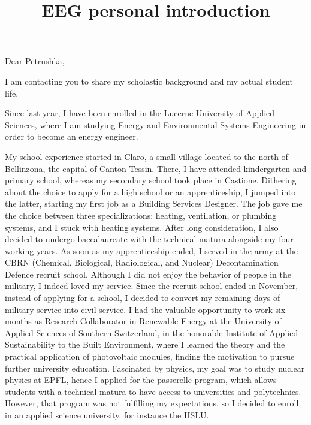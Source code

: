 \documentclass{article}
\title{\textbf{EEG personal introduction}}
\date{}
\begin{document}
\maketitle
\vspace*{-1.5cm}

Dear Petrushka,
\setlength{\parskip}{1.5em}

I am contacting you to share my scholastic background and my actual student life.
\setlength{\parskip}{.3em}

Since last year, I have been enrolled in the Lucerne University of Applied Sciences, where I
am studying Energy and Environmental Systems Engineering in order to become an energy engineer.
\setlength{\parskip}{1em}

My school experience started in Claro, a small village located to the north of Bellinzona,
the capital of Canton Tessin. There, I have attended kindergarten and primary school,
whereas my secondary school took place in Castione.
Dithering about the choice to apply for a high school or an apprenticeship, I jumped into
the latter, starting my first job as a Building Services Designer. The job gave me the
choice between three specializations: heating, ventilation, or plumbing systems,
and I stuck with heating systems. After long consideration, I also decided to undergo
baccalaureate with the technical matura alongside my four working years.
As soon as my apprenticeship ended, I served in the army at the CBRN
(Chemical, Biological, Radiological, and Nuclear) Decontamination Defence recruit school.
Although I did not enjoy the behavior of people in the military, I indeed loved my service.
Since the recruit school ended in November, instead of applying for a school, I decided to
convert my remaining days of military service into civil service.
I had the valuable opportunity to work six months as Research Collaborator in Renewable Energy
at the University of Applied Sciences of Southern Switzerland, in the honorable Institute
of Applied Sustainability to the Built Environment, where I learned the theory and the
practical application of photovoltaic modules, finding the motivation to pursue further
university education.
Fascinated by physics, my goal was to study nuclear physics at EPFL, hence I applied for
the passerelle program, which allows students with a technical matura to have access to
universities and polytechnics. However, that program was not fulfilling my expectations,
so I decided to enroll in an applied science university, for instance the HSLU.
\end{document}
